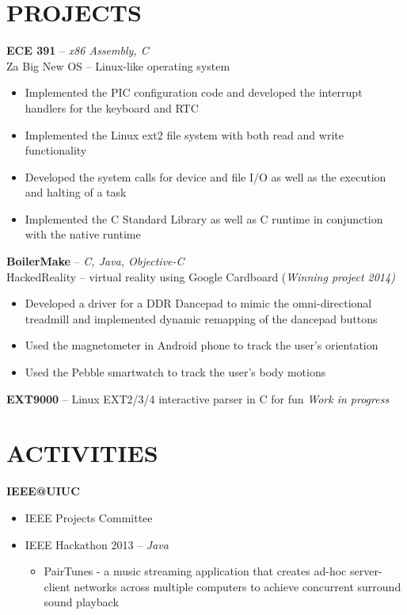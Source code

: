 \documentclass[resmargin]{res}
\begin{document}
\begin{resume}
\section{PROJECTS} 
{\bf ECE 391} -- {\sl x86 Assembly, C} \\ 
\textnormal {Za Big New OS -- Linux-like operating system} 
\begin{itemize} \itemsep -2pt
\vspace {.5mm}
\item Implemented the PIC configuration code and developed the interrupt handlers for the keyboard and RTC
\item Implemented the Linux ext2 file system with both read and write functionality
\item Developed the system calls for device and file I/O as well as the execution and halting of a task
\item Implemented the C Standard Library as well as C runtime in conjunction with the native runtime 
\end{itemize}
\vspace{-3mm}
{\bf BoilerMake} -- {\sl C, Java, Objective-C} \\
\textnormal {HackedReality -- virtual reality using Google Cardboard} (\sl {Winning project 2014})
\begin{itemize} \itemsep -2pt
\item Developed a driver for a DDR Dancepad to mimic the omni-directional treadmill and implemented dynamic remapping of the dancepad buttons
\item Used the magnetometer in Android phone to track the user's orientation
\item Used the Pebble smartwatch to track the user's body motions
\end{itemize}
\vspace{-3mm}
{\bf EXT9000} -- Linux EXT2/3/4 interactive parser in C for fun \hfill {\sl Work in progress} 

\vspace{-4mm}
\section {ACTIVITIES}

{\bf IEEE@UIUC}
\begin{itemize} \itemsep -2pt 
 \item IEEE Projects Committee
 \item IEEE Hackathon 2013 -- {\sl Java}
 \begin{itemize}
  \setlength{\itemsep}{2pt}
  \vspace{-2mm}
  \item PairTunes - a music streaming application that creates ad-hoc server-client networks across multiple computers to achieve concurrent surround sound playback
 \end{itemize}
\end{itemize}


\end{resume}
\end{document}
